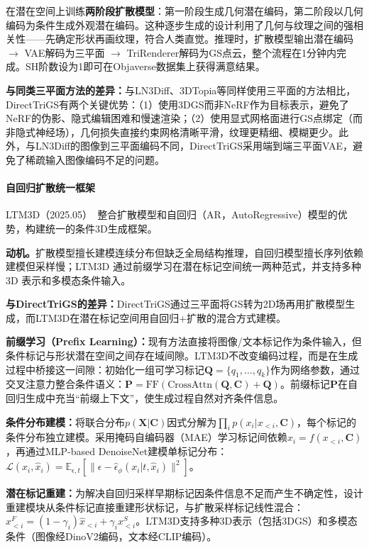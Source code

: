 在潜在空间上训练\textbf{两阶段扩散模型}：第一阶段生成几何潜在编码，第二阶段以几何编码为条件生成外观潜在编码。这种逐步生成的设计利用了几何与纹理之间的强相关性——先确定形状再画纹理，符合人类直觉。推理时，扩散模型输出潜在编码$\to$ VAE解码为三平面 $\to$ TriRenderer解码为GS点云，整个流程在1分钟内完成。SH阶数设为1即可在Objaverse数据集上获得满意结果。

\textbf{与同类三平面方法的差异：}与LN3Diff、3DTopia等同样使用三平面的方法相比，DirectTriGS有两个关键优势：（1）使用3DGS而非NeRF作为目标表示，避免了NeRF的伪影、隐式编辑困难和慢速渲染；（2）使用显式网格面进行GS点绑定（而非隐式神经场），几何损失直接约束网格清晰平滑，纹理更精细、模糊更少。此外，与LN3Diff的图像到三平面编码不同，DirectTriGS采用端到端三平面VAE，避免了稀疏输入图像编码不足的问题。

\paragraph{自回归扩散统一框架}

LTM3D（2025.05）~\cite{2505_24245}整合扩散模型和自回归（AR，AutoRegressive）模型的优势，构建统一的条件3D生成框架。

\textbf{动机。}扩散模型擅长建模连续分布但缺乏全局结构推理，自回归模型擅长序列依赖建模但采样慢；LTM3D 通过前缀学习在潜在标记空间统一两种范式，并支持多种 3D 表示和多模态条件输入。

\textbf{与DirectTriGS的差异：}DirectTriGS通过三平面将GS转为2D场再用扩散模型生成，而LTM3D在潜在标记空间用自回归+扩散的混合方式建模。

\textbf{前缀学习（Prefix Learning）：}现有方法直接将图像/文本标记作为条件输入，但条件标记与形状潜在空间之间存在域间隙。LTM3D不改变编码过程，而是在生成过程中桥接这一间隙：初始化一组可学习标记$\mathbf{Q}=\{q_1, \ldots, q_k\}$作为网络参数，通过交叉注意力整合条件语义：$\mathbf{P} = \text{FF}(\text{CrossAttn}(\mathbf{Q}, \mathbf{C}) + \mathbf{Q})$。前缀标记$\mathbf{P}$在自回归生成中充当``前缀上下文''，使生成过程自然对齐条件信息。

\textbf{条件分布建模：}将联合分布$p(\mathbf{X}|\mathbf{C})$因式分解为$\prod_i p(x_i | x_{<i}, \mathbf{C})$，每个标记的条件分布独立建模。采用掩码自编码器（MAE）学习标记间依赖$x_i = f(x_{<i}, \mathbf{C})$，再通过MLP-based DenoiseNet建模单标记分布：$\mathcal{L}(x_i, \hat{x}_i) = \mathbb{E}_{\epsilon,t}[\|\epsilon - \hat{\epsilon}_\phi(x_i|t, \hat{x}_i)\|^2]$。

\textbf{潜在标记重建：}为解决自回归采样早期标记因条件信息不足而产生不确定性，设计重建模块从条件标记直接重建形状标记，与扩散采样标记线性混合：$x_{<i}^F = (1-\gamma_i)\hat{x}_{<i} + \gamma_i x_{<i}^S$。LTM3D支持多种3D表示（包括3DGS）和多模态条件（图像经DinoV2编码，文本经CLIP编码）。

